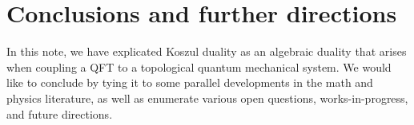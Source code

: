 \documentclass[11pt]{amsart}
\def\brian#1{{\textcolor{blue!65!red}{BRW: {#1}}}}
\def\natalie#1{{\textcolor{green!65!black}{NMP: {#1}}}}
\begin{document}



%

\section{Conclusions and further directions}\label{s:conclusions}


In this note, we have explicated Koszul duality as an algebraic duality that arises when coupling a QFT to a topological quantum mechanical system. We would like to conclude by tying it to some parallel developments in the math and physics literature, as well as enumerate various open questions, works-in-progress, and future directions.
\end{document}
